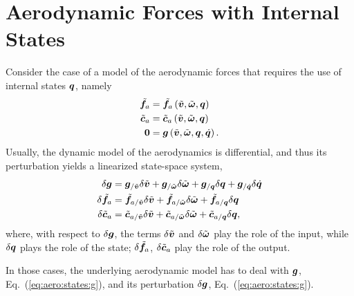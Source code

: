 \section{Aerodynamic Forces with Internal States}
Consider the case of a model of the aerodynamic forces
that requires the use of internal states $\bm{q}$, namely
\begin{subequations}
\begin{align}
	\tilde{\bm{f}}_a
	&=
	\tilde{\bm{f}}_a\left( \tilde{\bm{v}},\tilde{\bm{\omega}},\bm{q} \right)
	\\
	\tilde{\bm{c}}_a
	&=
	\tilde{\bm{c}}_a\left( \tilde{\bm{v}},\tilde{\bm{\omega}},\bm{q} \right)
	\\
	\bm{0}
	&=
	\bm{g}\left( \tilde{\bm{v}},\tilde{\bm{\omega}},\bm{q}, \dot{\bm{q}} \right)
	\label{eq:aero:states:g}
	.
\end{align}
\end{subequations}
Usually, the dynamic model of the aerodynamics is differential,
and thus its perturbation yields a linearized state-space system,
\begin{subequations}
\begin{align}
	\delta\bm{g}
	&=
	\bm{g}_{/\tilde{\bm{v}}} \delta\tilde{\bm{v}}
	+ \bm{g}_{/\tilde{\bm{\omega}}} \delta\tilde{\bm{\omega}}
	+ \bm{g}_{/\bm{q}} \delta\bm{q}
	+ \bm{g}_{/\dot{\bm{q}}} \delta\dot{\bm{q}}
	\label{eq:aero:states:delta-g}
	\\
	\delta \tilde{\bm{f}}_a
	&=
	\tilde{\bm{f}}_{a/\tilde{\bm{v}}} \delta\tilde{\bm{v}}
	+ \tilde{\bm{f}}_{a/\tilde{\bm{\omega}}} \delta\tilde{\bm{\omega}}
	+ \tilde{\bm{f}}_{a/\bm{q}} \delta\bm{q}
	\label{eq:aero:states:delta-f}
	\\
	\delta \tilde{\bm{c}}_a
	&=
	\tilde{\bm{c}}_{a/\tilde{\bm{v}}} \delta\tilde{\bm{v}}
	+ \tilde{\bm{c}}_{a/\tilde{\bm{\omega}}} \delta\tilde{\bm{\omega}}
	+ \tilde{\bm{c}}_{a/\bm{q}} \delta\bm{q}
	\label{eq:aero:states:delta-c}
	,
\end{align}
\end{subequations}
where, with respect to $\delta\bm{g}$, the terms $\delta\tilde{\bm{v}}$
and $\delta\tilde{\bm{\omega}}$ play the role of the input, while $\delta\bm{q}$
plays the role of the state;
$\delta\tilde{\bm{f}}_a$, $\delta\tilde{\bm{c}}_a$ play the role of the output.

In those cases, the underlying aerodynamic model has
to deal with $\bm{g}$, Eq.~(\ref{eq:aero:states:g}),
and its perturbation $\delta\bm{g}$, Eq.~(\ref{eq:aero:states:g}).

